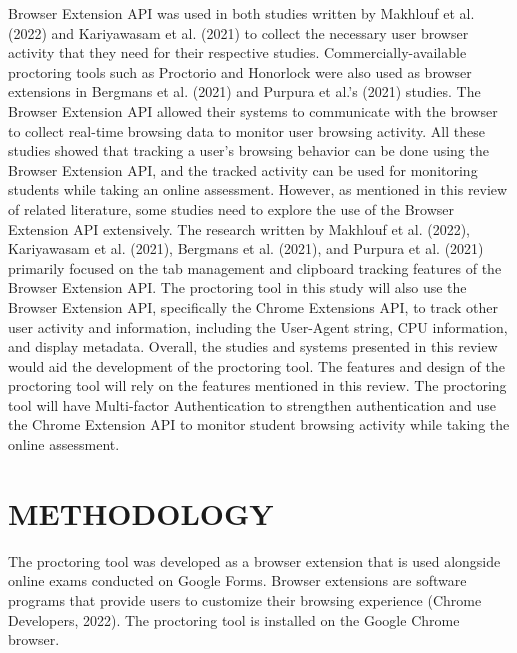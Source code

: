 \documentclass{icsthesis}
\begin{document}
\begin{mainmatter}
\indentThe Browser Extension API was used in both studies written by Makhlouf et al. (2022) and Kariyawasam et al. (2021) to collect the necessary user browser activity that they need for their respective studies. Commercially-available proctoring tools such as Proctorio and Honorlock were also used as browser extensions in Bergmans et al. (2021) and Purpura et al.'s (2021) studies. The Browser Extension API allowed their systems to communicate with the browser to collect real-time browsing data to monitor user browsing activity. All these studies showed that tracking a user's browsing behavior can be done using the Browser Extension API, and the tracked activity can be used for monitoring students while taking an online assessment. However, as mentioned in this review of related literature, some studies need to explore the use of the Browser Extension API extensively. The research written by Makhlouf et al. (2022), Kariyawasam et al. (2021), Bergmans et al. (2021), and Purpura et al. (2021) primarily focused on the tab management and clipboard tracking features of the Browser Extension API. The proctoring tool in this study will also use the Browser Extension API, specifically the Chrome Extensions API, to track other user activity and information, including the User-Agent string, CPU information, and display metadata. Overall, the studies and systems presented in this review would aid the development of the proctoring tool. The features and design of the proctoring tool will rely on the features mentioned in this review. The proctoring tool will have Multi-factor Authentication to strengthen authentication and use the Chrome Extension API to monitor student browsing activity while taking the online assessment.		
				
				
		
\section{METHODOLOGY}
The proctoring tool was developed as a browser extension that is used alongside online exams conducted on Google Forms. Browser extensions are software programs that provide users to customize their browsing experience (Chrome Developers, 2022). The proctoring tool is installed on the Google Chrome browser. 


\end{mainmatter}
\end{document}
